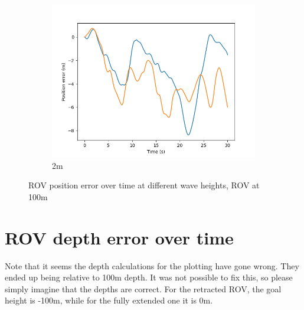 \documentclass[class=article, crop=false]{standalone}
\begin{document}
\begin{figure}
\begin{subfigure}[b]{0.48\textwidth}
        \includegraphics{scenario1/rov-100m/2.0m/rov_position_error_controlled}
        \caption{2m}
        \label{}
    \end{subfigure}

    \caption{ROV position error over time at different wave heights, ROV at 100m}
\end{figure}

\section{ROV depth error over time}
Note that it seems the depth calculations for the plotting have gone wrong. They ended up being relative to 100m depth. It was not possible to fix this, so please simply imagine that the depths are correct. For the retracted ROV, the goal height is -100m, while for the fully extended one it is 0m.
\end{document}
